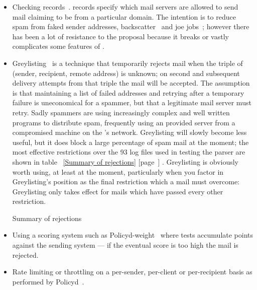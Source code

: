 \documentclass[a4paper,12pt,draft]{article}
\newcommand{\refwithpage}[1]{%
    \empty{}\ref{#1} [page~\pageref{#1}]%
}
\newcommand{\numberOFlogFILES}[0]{%
    93%
}
\begin{document}
\begin{itemize}

    \item Checking \SPF{} records~\cite{openspf, Wikipedia-spf}.
        \SPF{}\label{spf introduction}
        records specify which mail servers are allowed to send mail
        claiming to be from a particular domain.  The intention is to
        reduce spam from faked sender addresses,
        backscatter~\cite{postfix-backscatter} and joe
        jobs~\cite{Wikipedia-joe-job}; however there has been a lot of
        resistance to the proposal because it breaks or vastly complicates
        some features of \SMTP{}\@.

    \item Greylisting~\cite{greylisting} is a technique that temporarily
        rejects mail when the triple of (sender, recipient, remote \IP{}
        address) is unknown; on second and subsequent delivery attempts
        from that triple the mail will be accepted.  The assumption is that
        maintaining a list of failed addresses and retrying after a
        temporary failure is uneconomical for a spammer, but that a
        legitimate mail server must retry.  Sadly spammers are using
        increasingly complex and well written programs to distribute spam,
        frequently using an \ISP{} provided \SMTP{} server from a
        compromised machine on the \ISP{}'s network.  Greylisting will
        slowly become less useful, but it does block a large percentage of
        spam mail at the moment; the most effective restrictions over the
        \numberOFlogFILES{} log files used in testing the parser are shown
        in table~\refwithpage{Summary of rejections}.  Greylisting is
        obviously worth using, at least at the moment, particularly when
        you factor in Greylisting's position as the final restriction which
        a mail must overcome: Greylisting only takes effect for mails which
        have passed every other restriction.

        \begin{table}[ht]
            \caption{Summary of rejections}\label{Summary of rejections}
            
        \end{table}

    \item Using a scoring system such as
        Policyd-weight~\cite{policyd-weight} where tests accumulate points
        against the sending system --- if the eventual score is too high
        the mail is rejected.

    \item Rate limiting or throttling on a per-sender, per-client or
        per-recipient basis as performed by Policyd~\cite{policyd}.

\end{itemize}
\end{document}
